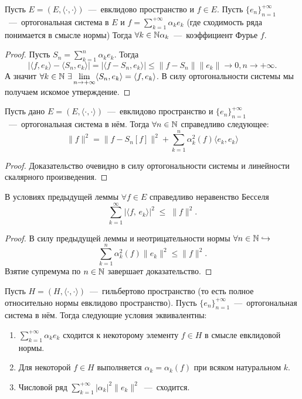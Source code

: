 \begin{theorem}[О единственности]
    Пусть $E = (E, \langle \cdot, \cdot \rangle)$~---~евклидово пространство и $f \in E$.
    Пусть $\{e_n\}_{n = 1}^{+\infty}$~---~ортогональная система в $E$ и $f = \sum\limits_{k = 1}^{+\infty} \alpha_k e_k$ (где сходимость ряда понимается в смысле нормы)
    Тогда $\forall k \in \mathbb{N} \alpha_k$~---~коэффициент Фурье $f$.
\end{theorem}
\begin{proof}
    Пусть $S_n = \sum\limits_{k = 1}^n \alpha_k e_k$.
    Тогда
    \[
        |\langle f, e_k \rangle - \langle S_n, e_k \rangle| = |\langle f - S_n, e_k \rangle| \leq \|f - S_n\|\|e_k\| \rightarrow 0, n \rightarrow +\infty.
    \]
    А значит $\forall k \in \mathbb{N} \ \exists \lim\limits_{n \rightarrow +\infty} \langle S_n, e_k \rangle = \langle f, e_k \rangle$.
    В силу ортогональности системы мы получаем искомое утверждение.
\end{proof}
\begin{lemma}
    Пусть дано $E = (E, \langle \cdot, \cdot \rangle)$~---~евклидово пространство и $\{e_n\}_{n = 1}^{+\infty}$~---~ортогональная система в нём.
    Тогда $\forall n \in \mathbb{N}$ справедливо следующее:
    \[
        \|f\|^2 = \|f - S_n[f]\|^2 + \sum\limits_{k = 1}^n \alpha_k^2(f)\langle e_k, e_k \rangle
    \]
\end{lemma}
\begin{proof}
    Доказательство очевидно в силу ортогональности системы и линейности скалярного произведения.
\end{proof}
\begin{corollary}
    В условиях предыдущей леммы $\forall f \in E$ справедливо неравенство Бесселя
\[
\sum_{k=1}^\infty \bigl|\langle f,\,e_k\rangle\bigr|^2 \;\le\;\|f\|^2.
\]

\end{corollary}
\begin{proof}
    В силу предыдущей леммы и неотрицательности нормы $\forall n \in \mathbb{N} \hookrightarrow$
    \[
        \sum\limits_{k = 1}^n \alpha_k^2(f)\|e_k\|^2 \leq \|f\|^2.
    \]
    Взятие супремума по $n \in \mathbb{N}$ завершает доказательство.
\end{proof}
\begin{theorem}
    Пусть $H = (H, \langle \cdot, \cdot \rangle)$~---~гильбертово пространство (то есть полное относительно нормы евклидово пространство).
    Пусть $\{e_n\}_{n = 1}^{+\infty}$~---~ортогональная система в нём.
    Тогда следующие условия эквивалентны:
    \begin{enumerate}
        \item $\sum\limits_{k = 1}^{+\infty} \alpha_k e_k$ сходится к некоторому элементу $f \in H$ в смысле евклидовой нормы.
        \item Для некоторой $f \in H$ выполняется $\alpha_k = \alpha_k(f)$ при всяком натуральном $k$.
        \item Числовой ряд $\sum\limits_{k = 1}^{+\infty} |\alpha_k|^2\|e_k\|^2$~---~сходится.
    \end{enumerate}
\end{theorem}
